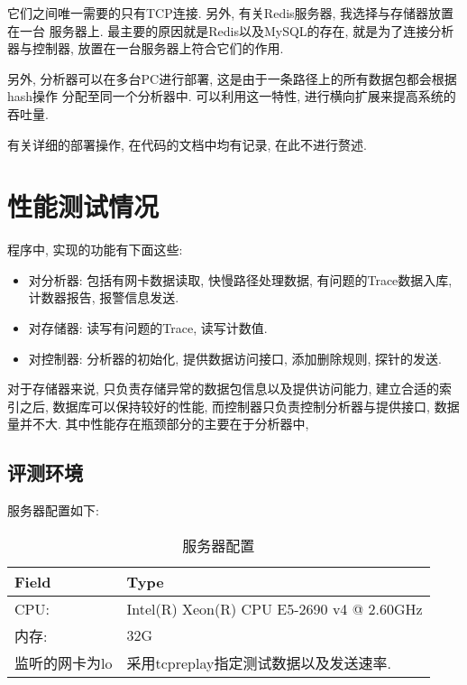   它们之间唯一需要的只有TCP连接. 另外, 有关Redis服务器, 我选择与存储器放置在一台
服务器上. 最主要的原因就是Redis以及MySQL的存在, 就是为了连接分析器与控制器,
放置在一台服务器上符合它们的作用.

  另外, 分析器可以在多台PC进行部署, 这是由于一条路径上的所有数据包都会根据hash操作
分配至同一个分析器中. 可以利用这一特性, 进行横向扩展来提高系统的吞吐量.

  有关详细的部署操作, 在代码的文档中均有记录, 在此不进行赘述.

\chapter{性能测试情况}

  程序中, 实现的功能有下面这些:

\begin{itemize}
    \item 对分析器: 包括有网卡数据读取, 快慢路径处理数据, 有问题的Trace数据入库,
计数器报告, 报警信息发送.
    \item 对存储器: 读写有问题的Trace, 读写计数值.
    \item 对控制器: 分析器的初始化, 提供数据访问接口, 添加删除规则, 探针的发送.
\end{itemize}

  对于存储器来说, 只负责存储异常的数据包信息以及提供访问能力, 建立合适的索引之后,
数据库可以保持较好的性能, 而控制器只负责控制分析器与提供接口, 数据量并不大.
其中性能存在瓶颈部分的主要在于分析器中,

\section{评测环境}

服务器配置如下:

\begin{table}[]
    \centering
    \caption{服务器配置}
    \label{server_config}
    \begin{tabular}{ll} \hline
    Field    & Type          \\ \hline
    CPU:     & Intel(R) Xeon(R) CPU E5-2690 v4 @ 2.60GHz \\
    内存:      & 32G                                       \\
    监听的网卡为lo & 采用tcpreplay指定测试数据以及发送速率. \\ \hline
    \end{tabular}
\end{table}


